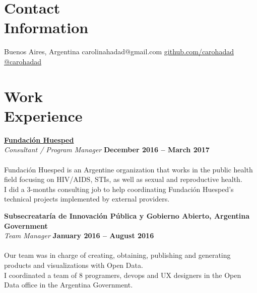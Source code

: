 \documentclass[margin,line]{resume}
\begin{document}
\begin{resume}

\section{\mysidestyle Contact\\Information}

\faMapMarker \vspace{5mm} Buenos Aires, Argentina \hfill
\faEnvelope \vspace{5mm} carolinahadad@gmail.com
\faGithub \vspace{5mm} \href{https://github.com/carohadad}{github.com/carohadad} \hfill
\faTwitter \vspace{5mm} \href{https://twitter.com/carohadad}{@carohadad}

\vspace{-1.5cm}
\section{\mysidestyle Work\\Experience}

\textbf{\href{https://www.huesped.org.ar/}{Fundaci\'on Huesped}}\\\vspace{1mm}
\textsl{Consultant / Program Manager} \hfill \textbf{December 2016 -- March 2017}\vspace{-3mm}\\\vspace{-1mm}
\\
Fundaci\'on Huesped is an Argentine organization that works in the public health field focusing on HIV/AIDS, STIs, as well as sexual and reproductive health.
\\
I did a 3-months consulting job to help coordinating Fundaci\'on Huesped's technical projects implemented by external providers.

\textbf{Subsecreatar\'ia de Innovaci\'on P\'ublica y Gobierno Abierto, Argentina Government}\vspace{2mm}\\\vspace{1mm}
\textsl{Team Manager} \hfill \textbf{January 2016 -- August 2016}\vspace{-3mm}\\\vspace{-1mm}
\\
Our team was in charge of creating, obtaining, publishing and generating products and visualizations with Open Data.
\\
I coordinated a team of 8 programers, devops and UX designers in the Open Data office in the Argentina Government. 


\end{resume}
\end{document}
